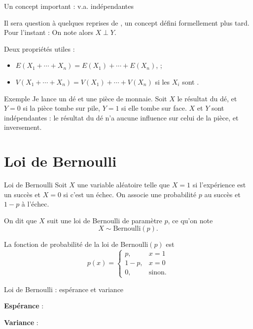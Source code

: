 \documentclass{BeamerTemplate}
\begin{document}
\begin{frame}[t]{Un concept important : v.a. indépendantes}

{\small
Il sera question à quelques reprises de , un concept défini formellement plus tard. Pour l'instant :
On note alors $X \perp Y$.

\smallskip
Deux propriétés utiles :
\begin{itemize}
\item $E(X_1+\cdots+X_n)=E(X_1)+\cdots+E(X_n)$, ;
\item $V(X_1+\cdots+X_n)=V(X_1)+\cdots+V(X_n)$ si les $X_i$ sont .
\end{itemize}
}

\begin{Boite}{Exemple}
{\footnotesize
Je lance un dé et une pièce de monnaie. Soit $X$ le résultat du dé, et $Y=0$ si la pièce tombe sur pile, $Y=1$ si elle tombe sur face. $X$ et $Y$ sont indépendantes : le résultat du dé n'a aucune influence sur celui de la pièce, et inversement.
}
\end{Boite}

\end{frame}

\section{Loi de Bernoulli}

\begin{frame}[t]{Loi de Bernoulli}
Soit $X$ une variable aléatoire telle que $X=1$ si l'expérience est un succès et $X=0$ si c'est un échec. On associe une probabilité $p$ au succès et $1-p$ à l'échec.

\bigskip
On dit que $X$ suit une loi de Bernoulli de paramètre $p$, ce qu'on note
$$X\sim \mbox{Bernoulli}(p).$$

La fonction de probabilité de la loi de Bernoulli$(p)$ est
$$
p(x)=\left\{\begin{array}{ll}
p, & x=1\\
1-p, & x=0\\
0, & \text{sinon.}
\end{array}\right.
$$

\end{frame}

\begin{frame}[t]{Loi de Bernoulli : espérance et variance}

\textbf{Espérance} :

\vspace{2cm}

\textbf{Variance} :

\end{frame}
\end{document}
